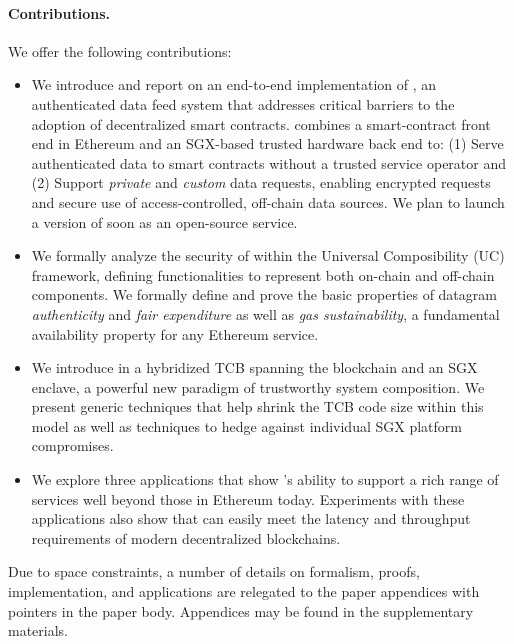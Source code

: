 \paragraph{\bf Contributions.}
We offer the following contributions:
\begin{itemize}[leftmargin=5mm]
\item
  \setlength{\itemsep}{2pt}
  \setlength{\parskip}{0pt}
  \setlength{\parsep}{0pt}
We introduce and report on an end-to-end implementation of \tcs, an authenticated data feed system that addresses critical barriers to the adoption of decentralized smart contracts. \tc combines a smart-contract front end in Ethereum and an SGX-based trusted hardware back end to: (1) Serve authenticated data to smart contracts without a trusted service operator and (2) Support {\em private} and {\em custom} data requests, enabling encrypted requests and secure use of access-controlled, off-chain data sources. We plan to launch a version of \tc soon as an open-source service.
\item We formally analyze the security of \tc within the Universal Composibility (UC) framework, defining functionalities to represent both on-chain and off-chain components. We formally define and prove the basic properties of datagram {\em authenticity} and {\em fair expenditure} as well as {\em gas sustainability}, a fundamental availability property for any Ethereum service. 
\item We introduce in \tc a hybridized TCB spanning the blockchain and an SGX enclave, a powerful new paradigm of trustworthy system composition. We present generic techniques that help shrink the TCB code size within this model as well as techniques to hedge against individual SGX platform compromises. 
\item We explore three \tc applications that show \tc's ability to support a rich range of services well beyond those in Ethereum today. Experiments with these applications also show that \tc can easily meet the latency and throughput requirements of modern decentralized blockchains. 

\end{itemize}

Due to space constraints, a number of details on formalism, proofs, implementation, and applications are relegated to the paper appendices with pointers in the paper body. Appendices may be found in the supplementary materials. 


